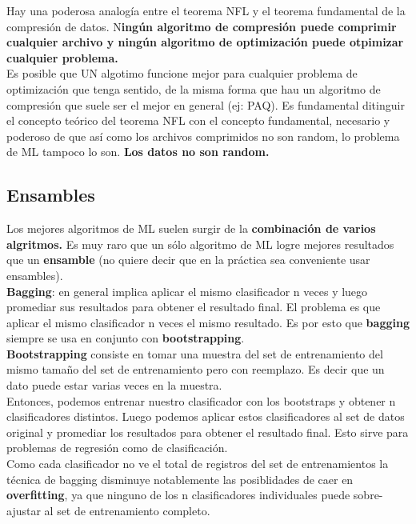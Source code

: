 \documentclass[titlepage,a4paper]{article}
\begin{document}
Hay una poderosa analogía entre el teorema NFL y el teorema fundamental de la compresión de datos. N\textbf{ingún algoritmo de compresión puede comprimir cualquier archivo y ningún algoritmo de optimización puede otpimizar cualquier problema. }\\

Es posible que UN algotimo funcione mejor para cualquier problema de optimización que tenga sentido, de la misma forma que hau un algoritmo de compresión que suele ser el mejor en general (ej: PAQ). Es fundamental ditinguir el concepto teórico del teorema NFL con el concepto fundamental, necesario y poderoso de que así como los archivos comprimidos no son random, lo problema de ML tampoco lo son. \textbf{Los datos no son random.}


\subsection*{Ensambles}
Los mejores algoritmos de ML suelen surgir de la \textbf{combinación de varios algritmos.} Es muy raro que un sólo algoritmo de ML logre mejores resultados que un \textbf{ensamble} (no quiere decir que en la práctica sea conveniente usar ensambles).\\

\textbf{Bagging}: en general implica aplicar el mismo clasificador n veces y luego promediar sus resultados para obtener el resultado final. El problema es que aplicar el mismo clasificador n veces el mismo resultado. Es por esto que \textbf{bagging} siempre se usa en conjunto con \textbf{bootstrapping}.\\

\textbf{Bootstrapping} consiste en tomar una muestra del set de entrenamiento del mismo tamaño del set de entrenamiento pero con reemplazo. Es decir que un dato puede estar varias veces en la muestra. \\

Entonces, podemos entrenar nuestro clasificador con los bootstraps y obtener n clasificadores distintos. Luego podemos aplicar estos clasificadores al set de datos original y promediar los resultados para obtener el resultado final. Esto sirve para problemas de regresión como de clasificación. \\

Como cada clasificador no ve el total de registros del set de entrenamientos la técnica de bagging disminuye notablemente las posiblidades de caer en \textbf{overfitting}, ya que ninguno de los n clasificadores individuales puede sobre-ajustar al set de entrenamiento completo. \\
\end{document}
